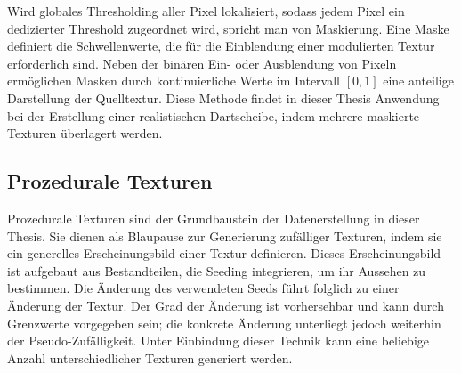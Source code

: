 Wird globales Thresholding aller Pixel lokalisiert, sodass jedem Pixel ein dedizierter Threshold zugeordnet wird, spricht man von Maskierung. Eine Maske definiert die Schwellenwerte, die für die Einblendung einer modulierten Textur erforderlich sind. Neben der binären Ein- oder Ausblendung von Pixeln ermöglichen Masken durch kontinuierliche Werte im Intervall $[0, 1]$ eine anteilige Darstellung der Quelltextur. Diese Methode findet in dieser Thesis Anwendung bei der Erstellung einer realistischen Dartscheibe, indem mehrere maskierte Texturen überlagert werden.


\subsection{Prozedurale Texturen}
\label{sec:was_prozedurale_texturen}

Prozedurale Texturen sind der Grundbaustein der Datenerstellung in dieser Thesis. Sie dienen als Blaupause zur Generierung zufälliger Texturen, indem sie ein generelles Erscheinungsbild einer Textur definieren. Dieses Erscheinungsbild ist aufgebaut aus Bestandteilen, die Seeding integrieren, um ihr Aussehen zu bestimmen. Die Änderung des verwendeten Seeds führt folglich zu einer Änderung der Textur. Der Grad der Änderung ist vorhersehbar und kann durch Grenzwerte vorgegeben sein; die konkrete Änderung unterliegt jedoch weiterhin der Pseudo-Zufälligkeit. Unter Einbindung dieser Technik kann eine beliebige Anzahl unterschiedlicher Texturen generiert werden.
